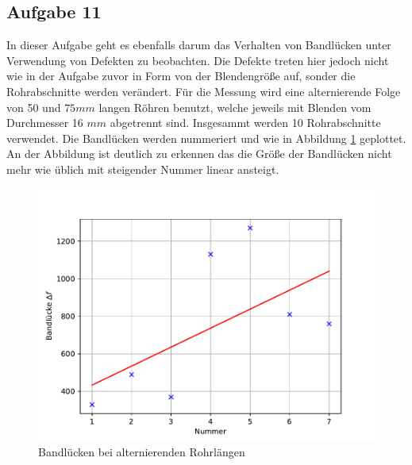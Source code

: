 \subsection{Aufgabe 11}
In dieser Aufgabe geht es ebenfalls darum das Verhalten von Bandlücken unter Verwendung von Defekten zu beobachten.
Die Defekte treten hier jedoch nicht wie in der Aufgabe zuvor in Form von der Blendengröße auf, sonder die Rohrabschnitte werden verändert.
Für die Messung wird eine alternierende Folge von 50 und $75\si{mm}$ langen Röhren benutzt, welche jeweils mit Blenden vom Durchmesser 16 $\si{mm}$ abgetrennt sind.
Insgesammt werden 10 Rohrabschnitte verwendet.
Die Bandlücken werden nummeriert und wie in Abbildung \ref{fig.Aufgabe11} geplottet.
An der Abbildung ist deutlich zu erkennen das die Größe der Bandlücken nicht mehr wie üblich mit steigender Nummer linear ansteigt.
\begin{figure}[h!]
  \centering
  \includegraphics[width=\textwidth]{A11.pdf}
  \caption{Bandlücken bei alternierenden Rohrlängen}
  \label{fig.Aufgabe11}
\end{figure}
\FloatBarrier

